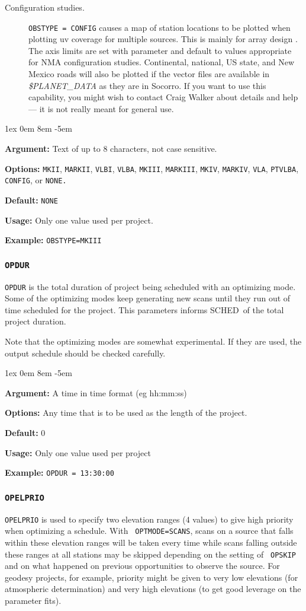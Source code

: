 \documentclass{report}
\newcommand{\schedb}{{\sc SCHED~}}
\newcommand{\rcwbox}[5]{
  \begin{list}{}{\parsep 1ex  \itemsep 0em
                 \leftmargin 8em  \itemindent -5em }
    \item {\bf Argument:} #1
    \item {\bf Options:}  #2
    \item {\bf Default:}  #3
    \item {\bf Usage:}    #4
    \item {\bf Example:}  #5
  \end{list}
}
\begin{document}
\begin{description}
\item[Configuration studies.]  {\tt OBSTYPE = CONFIG} causes a map
of station locations to be plotted when plotting uv coverage for
multiple sources.  This is mainly for array design
.
The axis limits are set with parameter
 and default to values appropriate
for NMA configuration studies.  Continental, national, US state,
and New Mexico roads will also be plotted if the vector files are
available in {\sl \$PLANET\_DATA} as they are in Socorro.  If you want
to use this capability, you might wish to contact Craig Walker
about details and help --- it is not really meant for general use.

\end{description}

\rcwbox
{Text of up to 8 characters, not case sensitive.}
{{\tt MKII}, {\tt MARKII}, {\tt VLBI}, {\tt VLBA}, {\tt MKIII},
{\tt MARKIII}, {\tt MKIV}, {\tt MARKIV}, {\tt VLA}, {\tt PTVLBA},
{\tt CONFIG}, or {\tt NONE.}}
{\tt NONE}
{Only one value used per project.}
{{\tt OBSTYPE=MKIII}}


\subsubsection{\label{MP:OPDUR}{\tt OPDUR}}

{\tt OPDUR} is the total duration of project being scheduled with an
optimizing mode.  Some of the optimizing modes keep generating new scans
until they run out of time scheduled for the project.  This parameters
informs \schedb of the total project duration.

Note that the optimizing modes are somewhat experimental.  If they are used,
the output schedule should be checked carefully.

\rcwbox
{A time in time format (eg hh:mm:ss)}
{Any time that is to be used as the length of the project.}
{0}
{Only one value used per project}
{{\tt OPDUR = 13:30:00}}

\subsubsection{\label{MP:OPELPRIO}{\tt OPELPRIO}}

{\tt OPELPRIO} is used to specify two elevation ranges (4 values) to
give high priority when optimizing a schedule.  With {\tt
OPTMODE=SCANS}, scans on a source that falls within these elevation
ranges will be taken every time while scans falling outside these
ranges at all stations may be skipped depending on the setting of {\tt
OPSKIP} and on what happened on previous opportunities to observe the
source.  For geodesy projects, for example, priority might be given to
very low elevations (for atmospheric determination) and very high
elevations (to get good leverage on the parameter fits).
\end{document}
